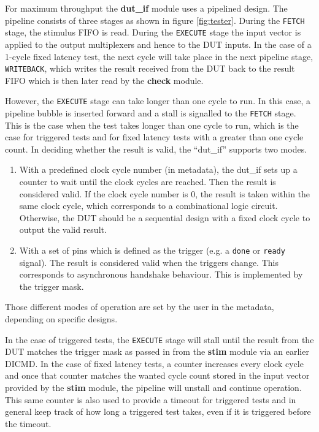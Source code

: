For maximum throughput the \textbf{dut\_if} module uses a pipelined design. The pipeline consists of three stages
as shown in figure \ref{fig:tester}. During the \texttt{FETCH} stage, the stimulus FIFO is read. During the \texttt{EXECUTE}
stage the input vector is applied to the output multiplexers and hence to the DUT inputs. In the case of a 1-cycle
fixed latency test, the next cycle will take place in the next pipeline stage, \texttt{WRITEBACK}, which writes the result
received from the DUT back to the result FIFO which is then later read by the \textbf{check} module.

However, the \texttt{EXECUTE} stage can take longer than one cycle to run. In this case, a pipeline bubble is inserted forward
and a stall is signalled to the \texttt{FETCH} stage. This is the case when the test takes longer than one cycle to run, which
is the case for triggered tests and for fixed latency tests with a greater than one cycle count.
In deciding whether the result is valid, the ``dut\_if'' supports two modes.

\begin{enumerate}
 \item With a predefined clock cycle number (in metadata), the dut\_if sets up a counter to wait until the clock cycles are reached. Then the result is considered valid. If the clock cycle number is 0, the result is taken within the same clock cycle, which corresponds to a combinational logic circuit. Otherwise, the DUT should be a sequential design with a fixed clock cycle to output the valid result.

 \item With a set of pins which is defined as the trigger (e.g. a \texttt{done} or \texttt{ready} signal). The result is considered valid when the triggers change. This corresponds to asynchronous handshake behaviour. This is implemented by the trigger mask.
\end{enumerate}

Those different modes of operation are set by the user in the metadata, depending on specific designs.

In the case of triggered
tests, the \texttt{EXECUTE} stage will stall until the result from the DUT matches the trigger mask as passed in from the
\textbf{stim} module via an earlier DICMD. In the case of fixed latency tests, a counter increases every clock cycle and once
that counter matches the wanted cycle count stored in the input vector provided by the \textbf{stim} module, the pipeline
will unstall and continue operation. This same counter is also used to provide a timeout for triggered tests and in general
keep track of how long a triggered test takes, even if it is triggered before the timeout.


